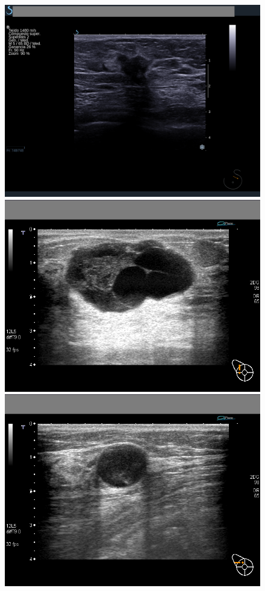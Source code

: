 \begin{frame}
\begin{overprint}
		\vspace{15pt}
		\begin{figure} 
		\includegraphics[trim = 480 250 400 165, clip,height=.30\textheight]{sono/a20120525p062_1_1}\hspace{.5pt}
\includegraphics[trim = 92 75 88 85, clip,height=.30\textheight]{sono/00162}\hspace{.5pt}
\includegraphics[trim = 110 75 150 85, clip,height=.30\textheight]{sono/00166}

\end{figure}
\end{overprint}
\end{frame}
